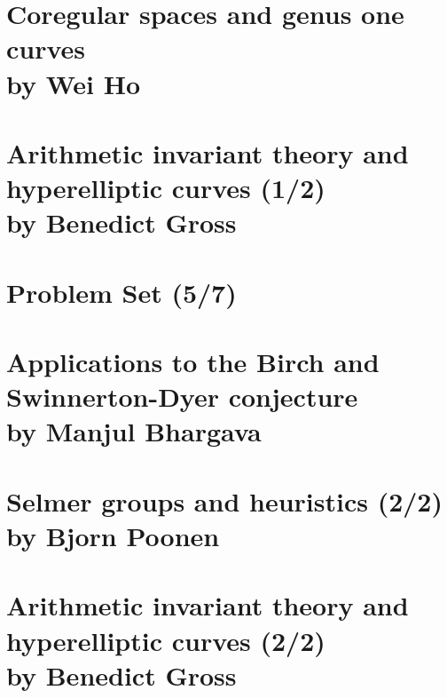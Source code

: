 \documentclass[12pt,amsfont]{amsart}
\begin{document}
\begingroup
\renewcommand{\addcontentsline}[3]{}%
\endgroup


\newpage
\renewcommand{\thesubsection}{\arabic{section}.\arabic{subsection}}
\section{Coregular spaces and genus one curves \\by Wei Ho}\label{27}


\newpage
\renewcommand{\thesubsection}{\arabic{section}.\arabic{subsection}}
\section{Arithmetic invariant theory and hyperelliptic curves (1/2)\\ by Benedict Gross}\label{28}

\newpage
\renewcommand{\thesubsection}{\arabic{section}.\arabic{subsection}}
\section{Problem Set (5/7)}\label{29}

\newpage
\renewcommand{\thesubsection}{\arabic{section}.\arabic{subsection}}
\section{Applications to the Birch and Swinnerton-Dyer conjecture\\ by  Manjul Bhargava}\label{30}

\newpage
\section{Selmer groups and heuristics (2/2)
\\by Bjorn Poonen}\label{31}

\begingroup
\renewcommand{\addcontentsline}[3]{}%
\endgroup


\newpage
\renewcommand{\thesubsection}{\arabic{section}.\arabic{subsection}}
\section{Arithmetic invariant theory and hyperelliptic curves (2/2)\\ by Benedict Gross}\label{32}
\end{document}
